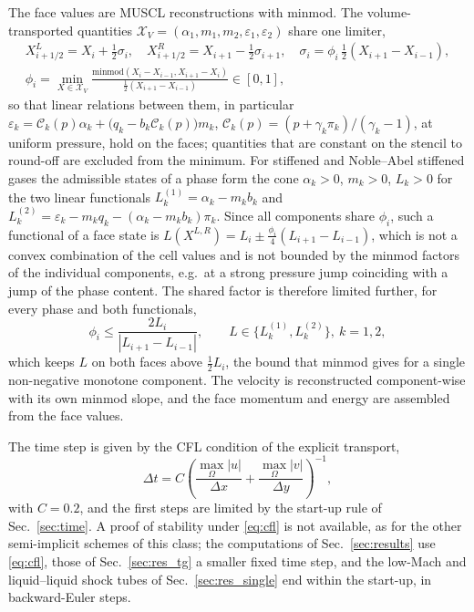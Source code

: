 The face values are MUSCL reconstructions \cite{vanLeer1979} with minmod. The volume-transported quantities
$\mathcal X_V=(\alpha_1,m_1,m_2,\varepsilon_1,\varepsilon_2)$ share one limiter,
\begin{equation}
\begin{gathered}
X^L_{i+1/2}=X_i+\tfrac12\sigma_i,\quad X^R_{i+1/2}=X_{i+1}-\tfrac12\sigma_{i+1},\quad \sigma_i=\phi_i\,\tfrac12(X_{i+1}-X_{i-1}),\\
\phi_i=\min_{X\in\mathcal X_V}\frac{\mathrm{minmod}(X_i-X_{i-1},X_{i+1}-X_i)}{\tfrac12(X_{i+1}-X_{i-1})}\in[0,1],
\end{gathered}
\label{eq:shared_limiter}
\end{equation}
so that linear relations between them, in particular $\varepsilon_k=\mathcal C_k(p)\alpha_k+\big(q_k-b_k\mathcal C_k(p)\big)m_k$, $\mathcal C_k(p)=(p+\gamma_k\pi_k)/(\gamma_k-1)$, at
uniform pressure, hold on the faces; quantities that are constant on the stencil to round-off are excluded from the minimum.
For stiffened and Noble--Abel stiffened gases the admissible states of a phase form the cone $\alpha_k>0$, $m_k>0$, $L_k>0$ for the
two linear functionals $L^{(1)}_k=\alpha_k-m_kb_k$ and $L^{(2)}_k=\varepsilon_k-m_kq_k-(\alpha_k-m_kb_k)\pi_k$. Since all components share $\phi_i$, such a
functional of a face state is $L(X^{L,R})=L_i\pm\tfrac{\phi_i}4(L_{i+1}-L_{i-1})$, which is not a convex combination of the cell values and is not
bounded by the minmod factors of the individual components, e.g.\ at a strong pressure jump coinciding with a jump of
the phase content. The shared factor is therefore limited further, for every phase and both functionals,
\begin{equation}
\phi_i\le\frac{2L_i}{|L_{i+1}-L_{i-1}|},\qquad L\in\{L^{(1)}_k,L^{(2)}_k\},\ k=1,2 ,
\label{eq:phi_cap}
\end{equation}
which keeps $L$ on both faces above $\tfrac12L_i$, the bound that minmod gives for a single non-negative monotone component. The velocity is reconstructed component-wise with its own minmod slope, and the face
momentum and energy are assembled from the face values.

The time step is given by the CFL condition of the explicit transport,
\begin{equation}
\Delta t=C\left(\frac{\max_\Omega|u|}{\Delta x}+\frac{\max_\Omega|v|}{\Delta y}\right)^{-1},
\label{eq:cfl}
\end{equation}
with $C=0.2$, and the first steps are limited by the
start-up rule of Sec.~\ref{sec:time}. A proof of stability under \eqref{eq:cfl} is not available, as for the
other semi-implicit schemes of this class; the computations of Sec.~\ref{sec:results} use \eqref{eq:cfl}, those of
Sec.~\ref{sec:res_tg} a smaller fixed time step, and the low-Mach and liquid--liquid shock tubes of Sec.~\ref{sec:res_single}
end within the start-up, in backward-Euler steps.


